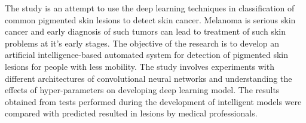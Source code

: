 The study is an attempt to use the deep learning techniques in classification 
of common pigmented skin lesions to detect skin cancer. Melanoma is serious skin cancer and early diagnosis 
of such tumors can lead to treatment of such skin problems at it's early stages. 
The objective of the research is to develop an artificial intelligence-based automated system for detection of pigmented skin lesions for people with less mobility. 
The study involves experiments with different architectures of convolutional neural networks and understanding the effects of hyper-parameters on developing deep learning model. 
The results obtained from tests performed during the development of intelligent models were compared with predicted resulted in lesions by medical professionals.
